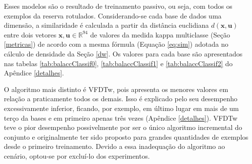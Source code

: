 Esses modelos são o resultado de treinamento passivo, ou seja, com todos os
exemplos da reserva rotulados.
Considerando-se cada base de dados uma dimensão,
a similaridade é calculada a partir da distância euclidiana $d(\bm{x},\bm{u})$
entre dois vetores $\bm{x},\bm{u} \in \mathbb{R}^{94}$
de valores da medida kappa multiclasse (Seção \ref{metricas})
de acordo com a mesma fórmula
(Equação \ref{eq:sim}) adotada no cálculo de densidade da Seção \ref{dw}.
Os valores para cada base são apresentados nas tabelas \ref{tab:balaccClassif0},
\ref{tab:balaccClassif1} e \ref{tab:balaccClassif2} do Apêndice \ref{detalhes}.

O algoritmo mais distinto é VFDTw, pois apresenta os menores valores em relação a
praticamente todos os demais.
Isso é explicado pelo seu desempenho excessivamente inferior,
ficando, por exemplo, em último lugar em mais de um terço da bases
e em primeiro apenas três vezes (Apêndice \ref{detalhes}).
VFDTw teve o pior desempenho possivelmente por ser o único algoritmo
incremental do conjunto e originalmente ter sido proposto para grandes
quantidades de exemplos desde o primeiro treinamento.
Devido a essa inadequação do algoritmo ao cenário, optou-se por excluí-lo dos
experimentos.


